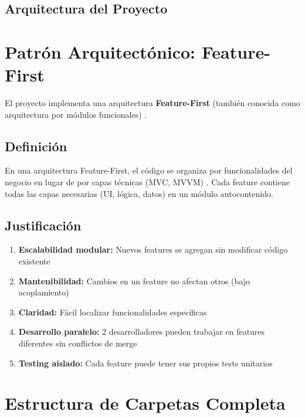 \subsection{Arquitectura del Proyecto}

\setlength{\tabcolsep}{4pt}
\setlength{\LTleft}{0pt}
\setlength{\LTright}{0pt}
\lstset{basicstyle=\ttfamily\small, breaklines=true, breakatwhitespace=true, columns=fullflexible, keepspaces=true}

\section{Patrón Arquitectónico: Feature-First}

El proyecto implementa una arquitectura \textbf{Feature-First} (también conocida como arquitectura por módulos funcionales) \cite{feature_first_architecture}.

\subsection{Definición}

En una arquitectura Feature-First, el código se organiza por funcionalidades del negocio en lugar de por capas técnicas (MVC, MVVM) \cite{clean_architecture}. Cada feature contiene todas las capas necesarias (UI, lógica, datos) en un módulo autocontenido.

\subsection{Justificación}

\begin{enumerate}
    \item \textbf{Escalabilidad modular:} Nuevos features se agregan sin modificar código existente
    \item \textbf{Mantenibilidad:} Cambios en un feature no afectan otros (bajo acoplamiento)
    \item \textbf{Claridad:} Fácil localizar funcionalidades específicas
    \item \textbf{Desarrollo paralelo:} 2 desarrolladores pueden trabajar en features diferentes sin conflictos de merge
    \item \textbf{Testing aislado:} Cada feature puede tener sus propios tests unitarios
\end{enumerate}

\section{Estructura de Carpetas Completa}

